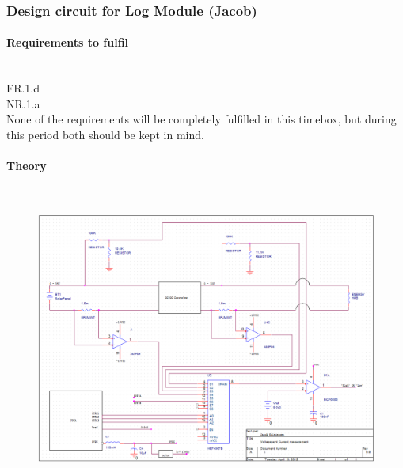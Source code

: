 \subsubsection{Design circuit for Log Module (Jacob)}
\paragraph{Requirements to fulfil}\mbox{}\\
FR.1.d\\
NR.1.a\\
None of the requirements will be completely fulfilled in this timebox, but during this period both should be kept in mind. 
\paragraph{Theory}\mbox{}\\

\begin{landscape}
\begin{figure}[H]
\centering
\includegraphics[width=20cm]{./img/vc_measure_schematic}
\caption{}
\label{fig:vc_measure_schematic}
\end{figure}
\end{landscape}

